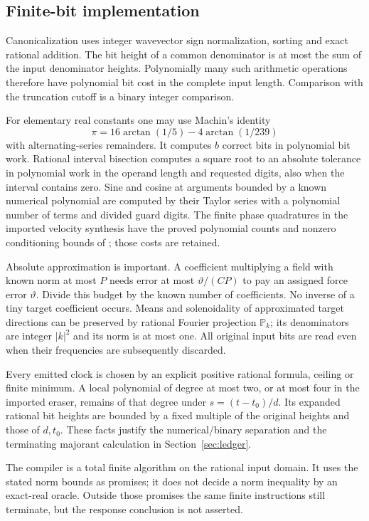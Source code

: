 \documentclass[11pt,a4paper]{amsart}
\theoremstyle{definition}
\theoremstyle{remark}
\numberwithin{equation}{section}
\newcommand{\PP}{\mathbb P}
\begin{document}
\subsection{Finite-bit implementation}
Canonicalization uses integer wavevector sign normalization, sorting and
exact rational addition. The bit height of a common denominator is at most
the sum of the input denominator heights. Polynomially many such arithmetic
operations therefore have polynomial bit cost in the complete input length.
Comparison with the truncation cutoff is a binary integer comparison.

For elementary real constants one may use Machin's identity
\[
 \pi=16\arctan(1/5)-4\arctan(1/239)
\]
with alternating-series remainders. It computes $b$ correct bits in
polynomial bit work. Rational interval bisection computes a square root
to an absolute tolerance in polynomial work in the operand length and
requested digits, also when the interval contains zero. Sine and cosine
at arguments bounded by a known numerical polynomial are computed by their
Taylor series with a polynomial number of terms and divided guard digits.
The finite phase quadratures in the imported velocity synthesis have the
proved polynomial counts and nonzero conditioning bounds of
\cite[Sections~8.3--8.4]{Common}; those costs are retained.

Absolute approximation is important. A coefficient multiplying a field
with known norm at most $P$ needs error at most $\vartheta/(CP)$ to pay
an assigned force error $\vartheta$. Divide this budget by the known
number of coefficients. No inverse of a tiny target coefficient occurs.
Means and solenoidality of approximated target directions can be preserved
by rational Fourier projection $\PP_k$; its denominators are integer
$|k|^2$ and its norm is at most one. All original input bits are read even
when their frequencies are subsequently discarded.

Every emitted clock is chosen by an explicit positive rational formula,
ceiling or finite minimum. A local polynomial of degree at most two,
or at most four in the imported eraser, remains of that degree under
$s=(t-t_0)/d$. Its expanded rational bit heights are bounded by a fixed
multiple of the original heights and those of $d,t_0$. These facts justify
the numerical/binary separation and the terminating majorant calculation
in Section~\ref{sec:ledger}.

The compiler is a total finite algorithm on the rational input domain.
It uses the stated norm bounds as promises; it does not decide a norm
inequality by an exact-real oracle. Outside those promises the same finite
instructions still terminate, but the response conclusion is not asserted.
\end{document}
